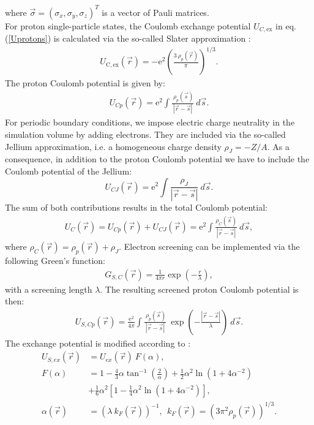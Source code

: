 \documentclass[3p]{elsarticle}
\begin{document}
where $\vec{\sigma} = (\sigma_x, \sigma_y, \sigma_z)^T$ is a vector of Pauli matrices. \\
For proton single-particle states, the Coulomb exchange potential $U_{C,\mathrm{ex}}$ in eq.(\ref{Uprotons}) is calculated via the so-called Slater approximation \cite{Chamel08}:
\begin{align}
U_\mathrm{C,ex} (\vec{r})= - \mathrm{e}^2 \left( \frac{3 \: \rho_p (\vec{r}) }{ \pi} \right)^{1/3}. 
\label{UCex}
\end{align}
The proton Coulomb potential is given by:
\begin{align}
U_{Cp} (\vec{r}) =  \mathrm{e}^2 \int \frac{ \: \rho_p (\vec{s})}{\left| \vec{r} - \vec{s} \right| } \: d \vec{s} . 
\label{UCp}
\end{align}
For periodic boundary conditions, we impose electric charge neutrality in the simulation volume by adding electrons. They are included via the so-called Jellium approximation, i.e. a homogeneous charge density $\rho_J = - Z/A$. As a consequence, in addition to the proton Coulomb potential we have to include the Coulomb potential of the Jellium:
\begin{equation}
U_{CJ} (\vec{r}) = \mathrm{e}^2 \int  \frac{\rho_J}{\left| \vec{r} - \vec{s} \right| } \: d \vec{s} .
\end{equation}
The sum of both contributions results in the total Coulomb potential: 
\begin{align}
U_C (\vec{r}) =  U_{Cp} (\vec{r}) + U_{CJ} (\vec{r}) =  \mathrm{e}^2 \int \frac{ \rho_C (\vec{s})}{\left| \vec{r} - \vec{s} \right| }  \: d\vec{s} , 
\end{align}  
where $\rho_C (\vec{r})= \rho_{p} (\vec{r})+ \rho_{J}$. Electron screening can be implemented via the following Green's function:
\begin{align}
G_{S,C} (\vec{r}) = \frac{1}{4 \pi r} \exp\left(-\frac{r}{\lambda}\right), 
\end{align}
with a screening length $\lambda$. The resulting screened proton Coulomb potential is then: 
\begin{align}
U_{S,Cp} (\vec{r}) = \frac{\mathrm{e}^2}{4 \pi}  \int \frac{ \: \rho_p (\vec{s})}{\left| \vec{r} - \vec{s} \right| } \: \exp\left(-\frac{\left| \vec{r} - \vec{s} \right|}{\lambda} \right)  \: d \vec{s}. 
\end{align}
The exchange potential is modified according to \cite{Mohammed84, Robinson62}:
\begin{align}
U_{S,ex} (\vec{r}) &= U_{ex} (\vec{r}) \: F(\alpha ), 
\label{Uscrex}\\
F(\alpha )& = 1 - \frac{4}{3} \alpha \tan^{-1} \left( \frac{2}{\alpha} \right) + \frac{1}{2} \alpha^2 \ln \left( 1 + 4 \alpha^{-2} \right) \\
&+ \frac{1}{6} \alpha^2 \left[ 1 - \frac{1}{4} \alpha^2 \ln ( 1 + 4 \alpha^{-2}) \right] , \\
 \alpha (\vec{r}) &= \left( \lambda \: k_F (\vec{r}) \right)^{-1}, \:\: k_F (\vec{r}) = \left(3 \pi^2 \rho_p (\vec{r}) \right)^{1/3} .
\label{Fgamma}
\end{align}
\end{document}
